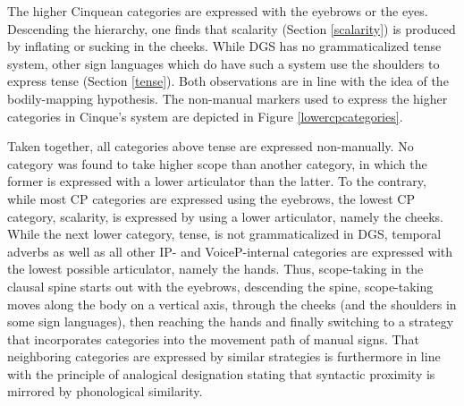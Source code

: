 The higher Cinquean categories are expressed with the eyebrows or the eyes. Descending the hierarchy, one finds that scalarity (Section \ref{scalarity}) is produced by inflating or sucking in the cheeks. While DGS has no grammaticalized tense system, other sign languages which do have such a system use the shoulders to express tense (Section \ref{tense}). Both observations are in line with the idea of the bodily-mapping hypothesis. The non-manual markers used to express the higher categories in Cinque's system are depicted in Figure \ref{lowercpcategories}.

Taken together, all categories above tense are expressed non-manually. No category was found to take higher scope than another category, in which the former is expressed with a lower articulator than the latter. To the contrary, while most CP categories are expressed using the eyebrows, the lowest CP category, scalarity, is expressed by using a lower articulator, namely the cheeks. While the next lower category, tense, is not grammaticalized in DGS, temporal adverbs as well as all other IP- and VoiceP-internal categories are expressed with the lowest possible articulator, namely the hands. Thus, scope-taking in the clausal spine starts out with the eyebrows, descending the spine, scope-taking moves along the body on a vertical axis, through the cheeks (and the shoulders in some sign languages), then reaching the hands and finally switching to a strategy that incorporates categories into the movement path of manual signs. That neighboring categories are expressed by similar strategies is furthermore in line with the principle of analogical designation stating that syntactic proximity is mirrored by phonological similarity. 



